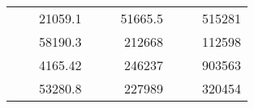 \begin{table}[H]
\begin{tabular}{|ccrccrccc}
\rowcolor[HTML]{DDFDFF} 
\multicolumn{1}{|c|}{\cellcolor[HTML]{FFFFC7}}                                & \multicolumn{1}{c|}{\cellcolor[HTML]{DDFDFF}}                      & \multicolumn{1}{r|}{\cellcolor[HTML]{DAE8FC}21059.1}   & \multicolumn{1}{c|}{\cellcolor[HTML]{FFFFC7}}                                & \multicolumn{1}{c|}{\cellcolor[HTML]{DDFDFF}}                       & \multicolumn{1}{r|}{\cellcolor[HTML]{DDFDFF}51665.5}   & \multicolumn{1}{c|}{\cellcolor[HTML]{FFFFC7}}                                & \multicolumn{1}{c|}{\cellcolor[HTML]{DDFDFF}}                      & \multicolumn{1}{r|}{\cellcolor[HTML]{DDFDFF}515281}    \\ \cline{3-3} \cline{6-6} \cline{9-9} 
\multicolumn{1}{|c|}{\cellcolor[HTML]{FFFFC7}}                                & \multicolumn{1}{c|}{\cellcolor[HTML]{DDFDFF}}                      & \multicolumn{1}{r|}{\cellcolor[HTML]{DDFDFF}58190.3}   & \multicolumn{1}{c|}{\cellcolor[HTML]{FFFFC7}}                                & \multicolumn{1}{c|}{\cellcolor[HTML]{DDFDFF}}                       & \multicolumn{1}{r|}{\cellcolor[HTML]{DAE8FC}212668}    & \multicolumn{1}{c|}{\cellcolor[HTML]{FFFFC7}}                                & \multicolumn{1}{c|}{\cellcolor[HTML]{DDFDFF}}                      & \multicolumn{1}{r|}{\cellcolor[HTML]{DAE8FC}112598}    \\ \cline{3-3} \cline{6-6} \cline{9-9} 
\rowcolor[HTML]{DDFDFF} 
\multicolumn{1}{|c|}{\cellcolor[HTML]{FFFFC7}}                                & \multicolumn{1}{c|}{\cellcolor[HTML]{DDFDFF}}                      & \multicolumn{1}{r|}{\cellcolor[HTML]{DAE8FC}4165.42}   & \multicolumn{1}{c|}{\cellcolor[HTML]{FFFFC7}}                                & \multicolumn{1}{c|}{\cellcolor[HTML]{DDFDFF}}                       & \multicolumn{1}{r|}{\cellcolor[HTML]{DDFDFF}246237}    & \multicolumn{1}{c|}{\cellcolor[HTML]{FFFFC7}}                                & \multicolumn{1}{c|}{\cellcolor[HTML]{DDFDFF}}                      & \multicolumn{1}{r|}{\cellcolor[HTML]{DDFDFF}903563}    \\ \cline{3-3} \cline{6-6} \cline{9-9} 
\multicolumn{1}{|c|}{\cellcolor[HTML]{FFFFC7}}                                & \multicolumn{1}{c|}{\cellcolor[HTML]{DDFDFF}}                      & \multicolumn{1}{r|}{\cellcolor[HTML]{DDFDFF}53280.8}   & \multicolumn{1}{c|}{\cellcolor[HTML]{FFFFC7}}                                & \multicolumn{1}{c|}{\cellcolor[HTML]{DDFDFF}}                       & \multicolumn{1}{r|}{\cellcolor[HTML]{DAE8FC}227989}    & \multicolumn{1}{c|}{\cellcolor[HTML]{FFFFC7}}                                & \multicolumn{1}{c|}{\cellcolor[HTML]{DDFDFF}}                      & \multicolumn{1}{r|}{\cellcolor[HTML]{DAE8FC}320454}    \\ \cline{3-3} \cline{6-6} \cline{9-9} 

\end{tabular}
\end{table}

